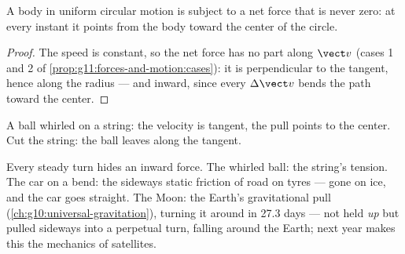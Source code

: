 \begin{proposition}\label{prop:g11:forces-and-motion:inward}
A body in uniform circular motion is subject to a net force that is
never zero: at every instant it points from the body toward the center
of the circle.
\end{proposition}

\begin{proof}
The speed is constant, so the net force has no part along $\vect v$
(cases 1 and 2 of \cref{prop:g11:forces-and-motion:cases}): it is
perpendicular to the tangent, hence along the radius --- and inward,
since every $\Delta \vect v$ bends the path toward the center.
\end{proof}

\begin{omfigure}

{\small A ball whirled on a string: the velocity is tangent, the pull
points to the center. Cut the string: the ball leaves along the tangent.}
\end{omfigure}

\begin{example}\label{ex:g11:forces-and-motion:moon}
Every steady turn hides an inward force. The whirled ball: the string's
tension. The car on a bend: the sideways static friction of road on
tyres --- gone on ice, and the car goes straight. The Moon: the Earth's
gravitational pull (\cref{ch:g10:universal-gravitation}), turning it
around in \num{27.3} days --- not held \emph{up} but pulled sideways into a
perpetual turn, falling around the Earth; next year makes this the
mechanics of satellites.
\end{example}


